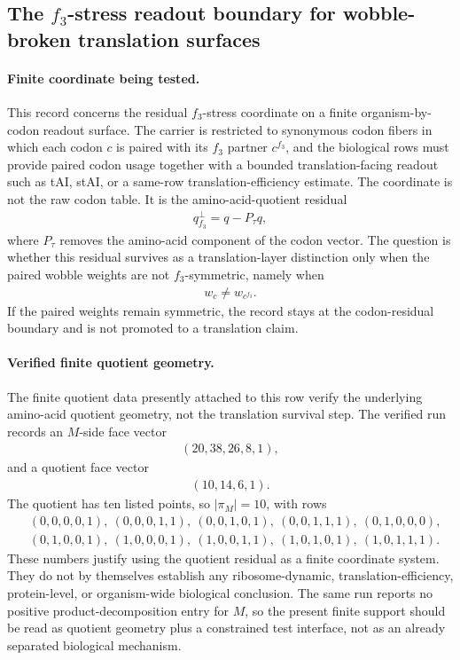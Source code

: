 \subsection{The $f_3$-stress readout boundary for wobble-broken translation surfaces}
\label{sec:q6-f3-stress-wobble-broken-translation-readout-survival-cross-layer}

\paragraph{Finite coordinate being tested.}
This record concerns the residual $f_3$-stress coordinate on a finite organism-by-codon readout surface.  The carrier is restricted to synonymous codon fibers in which each codon $c$ is paired with its $f_3$ partner $c^{f_3}$, and the biological rows must provide paired codon usage together with a bounded translation-facing readout such as tAI, stAI, or a same-row translation-efficiency estimate.  The coordinate is not the raw codon table.  It is the amino-acid-quotient residual
$$
\begin{aligned}
q_{f_3}^{\perp} = q - P_{\tau}q,
\end{aligned}
$$
where $P_{\tau}$ removes the amino-acid component of the codon vector.  The question is whether this residual survives as a translation-layer distinction only when the paired wobble weights are not $f_3$-symmetric, namely when
$$
\begin{aligned}
w_c \neq w_{c^{f_3}}.
\end{aligned}
$$
If the paired weights remain symmetric, the record stays at the codon-residual boundary and is not promoted to a translation claim.

\paragraph{Verified finite quotient geometry.}
The finite quotient data presently attached to this row verify the underlying amino-acid quotient geometry, not the translation survival step.  The verified run records an $M$-side face vector
$$
\begin{aligned}
(20,38,26,8,1),
\end{aligned}
$$
and a quotient face vector
$$
\begin{aligned}
(10,14,6,1).
\end{aligned}
$$
The quotient has ten listed points, so $|\pi_M|=10$, with rows
$$
\begin{aligned}
&(0,0,0,0,1),\ (0,0,0,1,1),\ (0,0,1,0,1),\ (0,0,1,1,1),\ (0,1,0,0,0),\\
&(0,1,0,0,1),\ (1,0,0,0,1),\ (1,0,0,1,1),\ (1,0,1,0,1),\ (1,0,1,1,1).
\end{aligned}
$$
These numbers justify using the quotient residual as a finite coordinate system.  They do not by themselves establish any ribosome-dynamic, translation-efficiency, protein-level, or organism-wide biological conclusion.  The same run reports no positive product-decomposition entry for $M$, so the present finite support should be read as quotient geometry plus a constrained test interface, not as an already separated biological mechanism.

